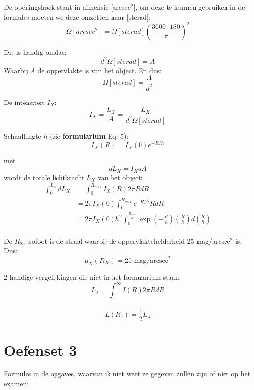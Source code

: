 \documentclass[a4paper,twoside]{article}
\theoremstyle{definition}
\theoremstyle{plain}
\begin{document}
De openingshoek staat in dimensie [arcsec\(^2\)], om deze te kunnen gebruiken in de formules moeten we deze omzetten naar [sterad]:
\[
\Omega[arcsec^2] = \Omega [sterad] \left(\frac{3600 \cdot 180}{\pi}\right)^2
\]

Dit is handig omdat:
\[
d^2 \Omega [sterad] = A
\]
Waarbij \(A\) de oppervlakte is van het object. En dus:
\[
\Omega [sterad] = \frac{A}{d^2}
\]

De intensiteit \(I_X\):
\begin{equation}
    I_X = \frac{L_X}{A} = \frac{L_X}{d^2 \Omega [sterad]}
\end{equation}

Schaallengte \(h\) (zie \textbf{formularium} Eq. 5):
\begin{equation}
    I_X (R) = I_X (0) e^{-R/h}
\end{equation}

met
\[
dL_X = I_X dA
\]
wordt de totale lichtkracht \(L_X\) van het object:
\begin{align*}
    \int_0^{L_X} d L_X &= \int_0^{R_{max}} I_X (R) 2 \pi R dR\\
    & = 2\pi I_X(0) \int_0^{R_{max}} e^{-R/h}  R dR \\
    & = 2\pi I_X(0) h^2 \int_0^{\frac{R_{max}}{h}} \exp \left( -\frac{R}{h} \right) \left( \frac{R}{h} \right) d\left( \frac{R}{h} \right)\\
\end{align*}

De \(R_{25}\)-isofoot is de straal waarbij de oppervlaktehelderheid 25 mag/arcsec\(^2\) is. Dus:
\begin{equation}
    \mu_X (R_{25}) = 25 \text{ mag/arcsec}^2
\end{equation}

2 handige vergelijkingen die niet in het formularium staan:
\begin{equation}
    \label{eq:handig1}
    L_\lambda = \int_{0}^{\infty} I(R) 2 \pi R dR
\end{equation}

\begin{equation}
    \label{eq:handig2}
   L(R_e) = \frac{1}{2} L_\lambda
\end{equation}


\section{Oefenset 3}

Formules in de opgaves, waarvan ik niet weet ze gegeven zullen zijn of niet op het examen:
\end{document}
